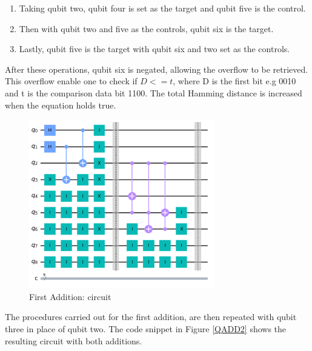 \begin{enumerate}
\item Taking qubit two, qubit four is set as the target and qubit five is the control. 
\vspace{0.3cm}

\item Then with qubit two and five as the controls, qubit six is the target.
\vspace{0.3cm}

\item Lastly, qubit five is the target with qubit six and two set as the controls.
\vspace{0.1cm}
\end{enumerate}

After these operations, qubit six is negated, allowing the overflow to be retrieved. This overflow enable one to check if $D<= t$, where D is the first bit e.g 0010 and t is the comparison data bit  1100. The total Hamming distance is increased when the equation holds true. %

\begin{figure}[H]
      \centering
      \includegraphics[scale=0.6]{background/firstAdd.png}
      \caption{First Addition: circuit}
      \label{QADD1}
\end{figure}

The procedures carried out for the first addition, are then repeated with qubit three in place of qubit two. The code snippet in Figure \ref{QADD2} shows the resulting circuit with both additions.

